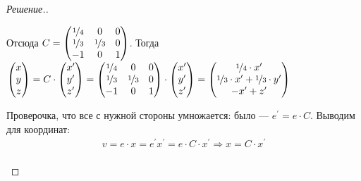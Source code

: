 \documentclass[a4paper]{article}
\theoremstyle{remark}
\begin{document}
\begin{proof}[Решение.]
\begin{enumerate}
                Отсюда $C = \begin{pmatrix}
                    \nicefrac14 & 0  & 0\\
                    \nicefrac13 & \nicefrac13  & 0\\
                    -1 & 0 & 1
                \end{pmatrix}    
                $. Тогда $
                \begin{pmatrix}
                    x\\
                    y\\
                    z \\
                \end{pmatrix} = C \cdot 
                \begin{pmatrix}
                    x^\prime\\
                    y^\prime\\
                    z^\prime \\
                \end{pmatrix} = 
                \begin{pmatrix}
                    \nicefrac14 & 0  & 0\\
                    \nicefrac13 & \nicefrac13  & 0\\
                    -1 & 0 & 1
                \end{pmatrix} \cdot 
                \begin{pmatrix}
                    x^\prime\\
                    y^\prime\\
                    z^\prime \\
                \end{pmatrix} = 
                \begin{pmatrix}
                    \nicefrac14 \cdot x^\prime\\
                    \nicefrac13 \cdot x^\prime + \nicefrac13 \cdot y^\prime\\
                    -x^\prime + z^\prime \\
                \end{pmatrix}
                $ 
                
                Проверочка, что все с нужной стороны умножается: было --- $e^\prime = e \cdot C$. 
                Выводим для координат: \begin{multline*}v = e \cdot x = e^\prime x^\prime = e \cdot C \cdot x^\prime 
                \Rightarrow x = C \cdot x^\prime \\\end{multline*}
            \end{enumerate}


\end{proof}
\end{document}

